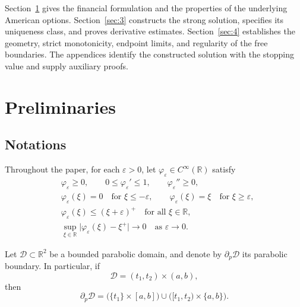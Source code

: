 \documentclass[11pt, a4paper, leqno]{amsart}
\numberwithin{equation}{section}
\theoremstyle{plain}
\theoremstyle{definition}
\theoremstyle{remark}
\def\leq{\leqslant}
\def\geq{\geqslant}
\begin{document}
{Section~\ref{sec:2} gives the financial formulation and the properties of
the underlying American options. Section~\ref{sec:3} constructs the strong
solution, specifies its uniqueness class, and proves derivative estimates.
Section~\ref{sec:4} establishes the geometry, strict monotonicity, endpoint
limits, and regularity of the free boundaries. The appendices identify the
constructed solution with the stopping value and supply auxiliary proofs.\label{rev:intro-end}
}


\section{Preliminaries}\label{sec:2}

\subsection{Notations}

{
Throughout the paper, for each $\varepsilon>0$, let
$\varphi_\varepsilon\in C^\infty(\mathbb R)$ satisfy
\begin{equation}\label{phiepsilon}
\begin{aligned}
&\varphi_\varepsilon\geq0,\qquad
0\leq\varphi_\varepsilon'\leq1,\qquad
\varphi_\varepsilon''\geq0,\\
&\varphi_\varepsilon(\xi)=0
\quad\text{for }\xi\leq-\varepsilon,
\qquad
\varphi_\varepsilon(\xi)=\xi
\quad\text{for }\xi\geq\varepsilon,\\
&\varphi_\varepsilon(\xi)\leq(\xi+\varepsilon)^+
\quad\text{for all }\xi\in\mathbb R,\\
&\sup_{\xi\in\mathbb R}
\big|\varphi_\varepsilon(\xi)-\xi^+\big|
\longrightarrow0
\quad\text{as }\varepsilon\to0.
\end{aligned}
\end{equation}
}

{
Let $\mathcal{D}\subset\mathbb{R}^2$ be a bounded parabolic domain,
and denote by $\partial_p\mathcal D$ its parabolic boundary.
In particular, if
\[
    \mathcal D=(t_1,t_2)\times(a,b),
\]
then
\[
    \partial_p\mathcal D
    =
    \big(\{t_1\}\times[a,b]\big)
    \cup
    \big([t_1,t_2)\times\{a,b\}\big).
\]
}
\end{document}
